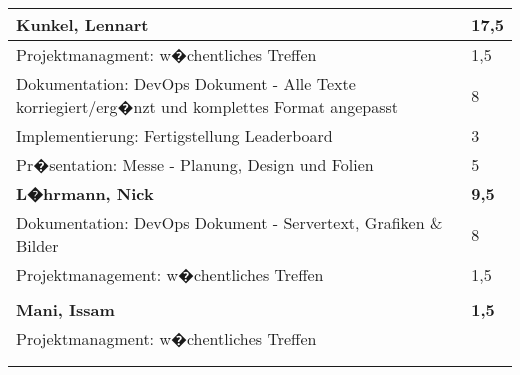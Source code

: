 \documentclass[a4paper,11pt]{scrartcl}
\begin{document}
\begin{longtable}{| p{13.8cm} | C{2.4cm} |}
	\textbf{Kunkel, Lennart} & \textbf{17,5}\\ %
	\hline

  Projektmanagment: w�chentliches Treffen
	&
  1,5
	\\
	\hline

  Dokumentation: DevOps Dokument - Alle Texte korriegiert/erg�nzt und komplettes Format angepasst
	&
  8
	\\
	\hline

  Implementierung: Fertigstellung Leaderboard
	&
  3
	\\
	\hline

  Pr�sentation: Messe - Planung, Design und Folien
	&
  5
	\\
	\hline
	\hline


	\textbf{L�hrmann, Nick} & \textbf{9,5}\\ %
	\hline

	Dokumentation: DevOps Dokument - Servertext, Grafiken \& Bilder
	&
	8
	\\
	\hline

	Projektmanagement: w�chentliches Treffen
	&
  1,5
	\\
	\hline


	&

	\\
	\hline
	\hline


	\textbf{Mani, Issam} & \textbf{1,5}\\ %
	\hline

  Projektmanagment: w�chentliches Treffen
	&

	\\
	\hline


	&

	\\
	\hline


	&

	\\
	\hline


\end{longtable}
\end{document}
